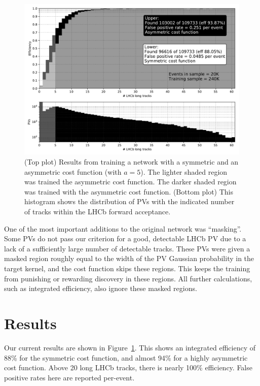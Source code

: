 \documentclass[10pt, paper=a4, UKenglish]{article}
\begin{document}
\begin{figure}[!htb]
	\centering
	\includegraphics[width=\textwidth]{images/effntrackspaper.pdf}
	\caption{
		(Top plot) Results from training a network with a symmetric and an asymmetric cost function (with $a=5$).
		The lighter shaded region was trained the asymmetric cost function. The darker shaded region was trained with the asymmetric cost function.
		(Bottom plot) This histogram shows the distribution of PVs with the indicated number of tracks within the LHCb forward acceptance.
	}
	\label{fig:results}
\end{figure}

One of the most important additions to the original network was ``masking''. Some PVs do not pass our criterion for a good, detectable LHCb PV due to a lack of a sufficiently large number of detectable tracks. These PVs were given a masked region roughly equal to the width of the PV Gaussian probability in the target kernel, and the cost function skips these regions. This keeps the training from punishing or rewarding discovery in these regions. All further calculations, such as integrated efficiency, also ignore these masked regions.

\section{Results}



Our current results are shown in Figure~\ref{fig:results}. This shows an integrated efficiency of 88\% for the symmetric cost function, and almost 94\% for a highly asymmetric cost function. Above 20 long LHCb tracks, there is nearly 100\% efficiency. False positive rates here are reported per-event.
\end{document}
